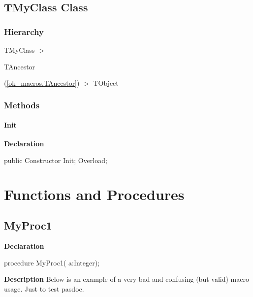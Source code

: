\documentclass{report}
\begin{document}
\subsection*{TMyClass Class}
\subsubsection*{\large{\textbf{Hierarchy}}\normalsize\hspace{1ex}\hfill}
TMyClass {$>$} \begin{ttfamily}TAncestor\end{ttfamily}(\ref{ok_macros.TAncestor}) {$>$} 
TObject
\subsubsection*{\large{\textbf{Methods}}\normalsize\hspace{1ex}\hfill}
\paragraph*{Init}\hspace*{\fill}

\begin{list}{}{
\setlength{\itemindent}{0cm}
\setlength{\listparindent}{0cm}
\setlength{\leftmargin}{\evensidemargin}
\addtolength{\leftmargin}{\tmplength}
\settowidth{\labelsep}{X}
\addtolength{\leftmargin}{\labelsep}
\setlength{\labelwidth}{\tmplength}
}
\begin{flushleft}
\item[\textbf{Declaration}\hfill]
\begin{ttfamily}
public Constructor Init; Overload;\end{ttfamily}


\end{flushleft}
\end{list}
\section{Functions and Procedures}
\subsection*{MyProc1}
\begin{list}{}{
\setlength{\itemindent}{0cm}
\setlength{\listparindent}{0cm}
\setlength{\leftmargin}{\evensidemargin}
\addtolength{\leftmargin}{\tmplength}
\settowidth{\labelsep}{X}
\addtolength{\leftmargin}{\labelsep}
\setlength{\labelwidth}{\tmplength}
}
\begin{flushleft}
\item[\textbf{Declaration}\hfill]
\begin{ttfamily}
procedure MyProc1( a:Integer);\end{ttfamily}


\end{flushleft}
\par
\item[\textbf{Description}]
Below is an example of a very bad and confusing (but valid) macro usage. Just to test pasdoc.

\end{list}
\end{document}

